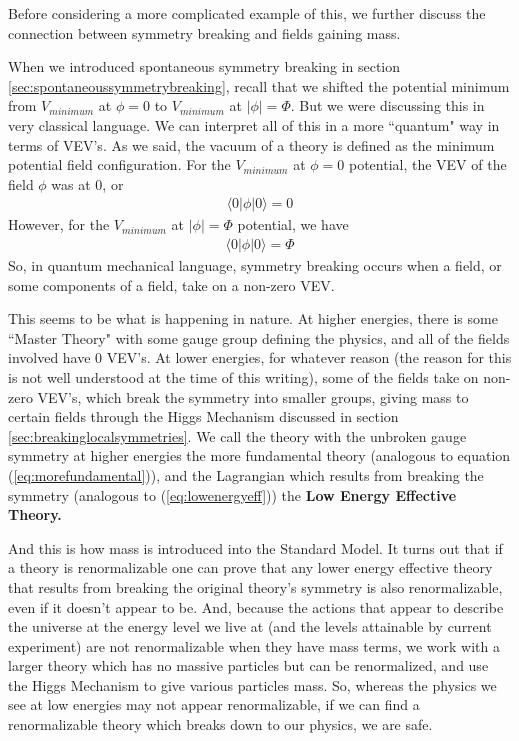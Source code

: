 \documentclass[12pt,epsf]{article}
\def\nolabel{\nonumber }
\def\nolabel{\nonumber }
\begin{document}
Before considering a more complicated example of this, we further
discuss the connection between symmetry breaking and fields gaining
mass.  

When we introduced spontaneous symmetry breaking in section
\ref{sec:spontaneoussymmetrybreaking}, recall that we shifted the
potential minimum from $V_{minimum}$ at $\phi=0$ to $V_{minimum}$ at
$|\phi| = \Phi$.  But we were discussing this in very classical
language.  We can interpret all of this in a more ``quantum" way in
terms of VEV's.  As we said, the vacuum of a theory is defined as the
minimum potential field configuration.	For the $V_{minimum}$ at
$\phi=0$ potential, the VEV of the field $\phi$ was at 0, or 
\begin{eqnarray}
\langle 0 | \phi | 0 \rangle = 0\nolabel
\end{eqnarray}
However, for the $V_{minimum}$ at $|\phi| = \Phi$ potential, we have
\begin{eqnarray}
\langle 0 | \phi | 0 \rangle = \Phi\nolabel
\end{eqnarray}
So, in quantum mechanical language, symmetry breaking occurs when a
field, or some components of a field, take on a non-zero VEV.  

This seems to be what is happening in nature.  At higher energies,
there is some ``Master Theory" with some gauge group defining the
physics, and all of the fields involved have 0 VEV's.  At lower
energies, for whatever reason (the reason for this is not well
understood at the time of this writing), some of the fields take on
non-zero VEV's, which break the symmetry into smaller groups, giving
mass to certain fields through the Higgs Mechanism discussed in section
\ref{sec:breakinglocalsymmetries}.  We call the theory with the
unbroken gauge symmetry at higher energies the more fundamental theory
(analogous to equation (\ref{eq:morefundamental})), and the Lagrangian
which results from breaking the symmetry (analogous to
(\ref{eq:lowenergyeff})) the \bf Low Energy Effective Theory\rm.  

And this is how mass is introduced into the Standard Model.  It turns
out that if a theory is renormalizable one can prove that any lower
energy effective theory that results from breaking the original
theory's symmetry is also renormalizable, even if it doesn't appear to
be.  And, because the actions that appear to describe the universe at
the energy level we live at (and the levels attainable by current
experiment) are not renormalizable when they have mass terms, we work
with a larger theory which has no massive particles but can be
renormalized, and use the Higgs Mechanism to give various particles
mass.  So, whereas the physics we see at low energies may not appear
renormalizable, if we can find a renormalizable theory which breaks
down to our physics, we are safe.  
\end{document}
